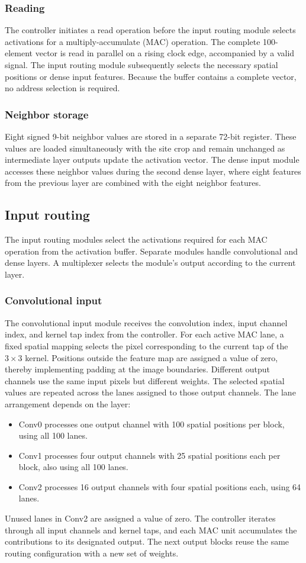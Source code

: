 \subsubsection{Reading}
The controller initiates a read operation before the input routing module selects activations for a multiply-accumulate (MAC) operation. The complete 100-element vector is read in parallel on a rising clock edge, accompanied by a valid signal. The input routing module subsequently selects the necessary spatial positions or dense input features. Because the buffer contains a complete vector, no address selection is required.
\subsubsection{Neighbor storage}
Eight signed 9-bit neighbor values are stored in a separate 72-bit register. These values are loaded simultaneously with the site crop and remain unchanged as intermediate layer outputs update the activation vector. The dense input module accesses these neighbor values during the second dense layer, where eight features from the previous layer are combined with the eight neighbor features.

\subsection{Input routing}
The input routing modules select the activations required for each MAC operation from the activation buffer. Separate modules handle convolutional and dense layers. A multiplexer selects the module's output according to the current layer.
\subsubsection{Convolutional input}
The convolutional input module receives the convolution index, input channel index, and kernel tap index from the controller. For each active MAC lane, a fixed spatial mapping selects the pixel corresponding to the current tap of the $3\times3$ kernel. Positions outside the feature map are assigned a value of zero, thereby implementing padding at the image boundaries. Different output channels use the same input pixels but different weights. The selected spatial values are repeated across the lanes assigned to those output channels.
The lane arrangement depends on the layer:
\begin{itemize}
    \item Conv0 processes one output channel with 100 spatial
          positions per block, using all 100 lanes.
    \item Conv1 processes four output channels with 25 spatial
          positions each per block, also using all 100 lanes.
    \item Conv2 processes 16 output channels with four spatial
          positions each, using 64 lanes.
\end{itemize}
Unused lanes in Conv2 are assigned a value of zero. The controller iterates through all input channels and kernel taps, and each MAC unit accumulates the contributions to its designated output. The next output blocks reuse the same routing configuration with a new set of weights.
